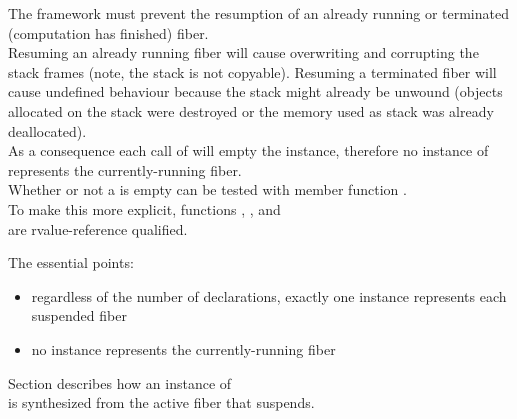 \label{invalidation}

The framework must prevent the resumption of an already running or terminated
(computation has finished) fiber.\\
Resuming an already running fiber will cause overwriting and corrupting the stack
frames (note, the stack is not copyable).  Resuming a terminated fiber will
cause undefined behaviour because the stack might already be unwound (objects
allocated on the stack were destroyed or the memory used as stack was already
deallocated).\\
As a consequence each call of \resume will empty the \fiber instance, therefore
no instance of \fiber represents the currently-running fiber.\\
Whether or not a \fiber is empty can be tested with member function \opbool.\\
To make this more explicit, functions \resume, \resumewith, \xtresume
and\\
\xtresumewith are rvalue-reference qualified.

The essential points:
\begin{itemize}
    \item regardless of the number of \fiber declarations, exactly one \fiber
          instance represents each suspended fiber
    \item no \fiber instance represents the currently-running fiber
\end{itemize}

Section  describes how an instance of\\
\fiber is synthesized from the active fiber that suspends.\\

